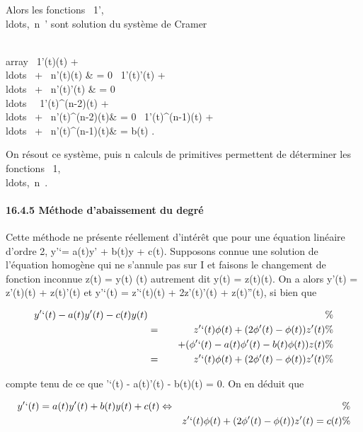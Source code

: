 Alors les fonctions
\lambda~1',\\ldots,\lambda~n~'
sont solution du système de Cramer

\left \\array
\lambda~1'(t)(t) +
\\ldots~ +
\lambda~n'(t)\phin(t) & = 0 \cr
\lambda~1'(t)'(t) +
\\ldots~ +
\lambda~n'(t)\phin'(t) & = 0\cr
\\ldots~
\cr \lambda~1'(t)^(n-2)(t) +
\\ldots~ +
\lambda~n'(t)\phin^(n-2)(t)& = 0 \cr
\lambda~1'(t)^(n-1)(t) +
\\ldots~ +
\lambda~n'(t)\phin^(n-1)(t)& = b(t) 
\right .

On résout ce système, puis n calculs de primitives permettent de
déterminer les fonctions
\lambda~1,\\ldots,\lambda~n~.

\paragraph{16.4.5 Méthode d'abaissement du degré}

Cette méthode ne présente réellement d'intérêt que pour une équation
linéaire d'ordre 2, y'`= a(t)y' + b(t)y + c(t). Supposons connue une
solution \phi de l'équation homogène qui ne s'annule pas sur I et faisons
le changement de fonction inconnue z(t) = y(t) \over
\phi(t) autrement dit y(t) = z(t)\phi(t). On a alors y'(t) = z'(t)\phi(t) +
z(t)\phi'(t) et y'`(t) = z'`(t)\phi(t) + 2z'(t)\phi'(t) + z(t)\phi''(t), si bien que

\begin{align*} y'`(t) - a(t)y'(t) - c(t)y(t)&&
\%& \\ & =& z'`(t)\phi(t) + (2\phi'(t) -
\phi(t))z'(t) \%& \\ & &
\quad + (\phi'`(t) - a(t)\phi'(t) - b(t)\phi(t))z(t)\%&
\\ & =& z'`(t)\phi(t) + (2\phi'(t) -
\phi(t))z'(t) \%& \\
\end{align*}

compte tenu de ce que \phi'`(t) - a(t)\phi'(t) - b(t)\phi(t) = 0. On en déduit
que

\begin{align*} y'`(t) = a(t)y'(t) + b(t)y(t) + c(t)
\Leftrightarrow&& \%& \\
& & z'`(t)\phi(t) + (2\phi'(t) - \phi(t))z'(t) = c(t)\%&
\\ \end{align*}

